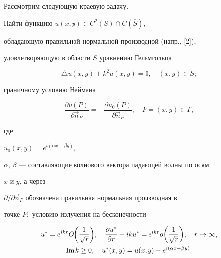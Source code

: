 Рассмотрим следующую краевую задачу.





Найти функцию $u (x,y) \in C^2 (S) \cap C(\overline{S})$,


обладающую правильной нормальной производной (напр., [2]),


удовлетворяющую в области $S$ уравнению Гельмгольца


\begin{equation}


\triangle u (x,y) + k^2 u (x,y) = 0, \quad (x,y) \in S;


\end{equation}


граничному условию Неймана


\begin{equation}


\frac{\partial u (P)}{\partial \vec{n}_P} = 


- \frac{\partial u_0 (P)}{\partial \vec{n}_P},


\quad P = (x,y) \in \Gamma,


\end{equation}


где


$u_0 (x,y) = \displaystyle e^{i (\alpha x - \beta y)}$,


$\alpha$, $\beta$ --- составляющие волнового вектора падающей волны по осям


$x$ и $y$, а через


$\partial / \partial \Vec{n}_P$ обозначена правильная нормальная производная в


точке $P;$ условию излучения на бесконечности


\begin{gather}


u^* = e^{i k r} O\bigg(\frac{1}{\sqrt {r}} \bigg), \quad


\frac{\partial u^*}{\partial r} - i k u^* = 


e^{i k r} o\bigg( \frac{1}{\sqrt{r}} \bigg),


\quad r \rightarrow \infty, \\


%


\im k \geq 0, \quad u^* (x,y) = u (x,y) -


e^{i (\alpha x - \beta y)}.\notag


\end{gather}





